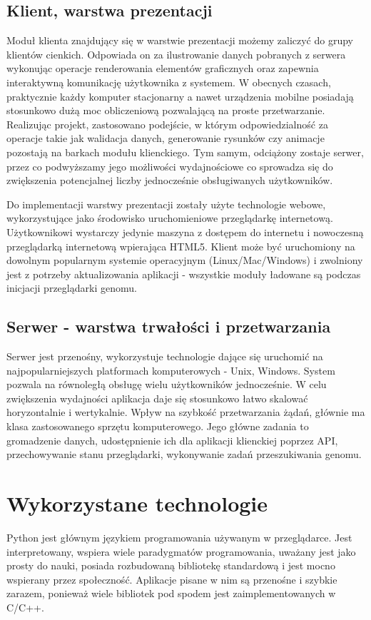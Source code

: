 \subsection*{Klient, warstwa prezentacji}
Moduł klienta znajdujący się w warstwie prezentacji możemy zaliczyć do grupy klientów cienkich.
Odpowiada on za ilustrowanie danych pobranych z serwera wykonując operacje renderowania elementów graficznych oraz zapewnia interaktywną komunikację użytkownika z systemem.
W obecnych czasach, praktycznie każdy komputer stacjonarny a nawet urządzenia mobilne posiadają stosunkowo dużą moc obliczeniową pozwalającą na proste przetwarzanie.
Realizując projekt, zastosowano podejście, w którym odpowiedzialność za operacje takie jak walidacja danych, generowanie rysunków czy animacje pozostają na barkach modułu klienckiego. 
Tym samym, odciążony zostaje serwer, przez co podwyższamy jego możliwości wydajnościowe co sprowadza się do zwiększenia potencjalnej liczby jednocześnie obsługiwanych użytkowników.

Do implementacji warstwy prezentacji zostały użyte technologie webowe, wykorzystujące jako środowisko uruchomieniowe przeglądarkę internetową. Użytkownikowi wystarczy jedynie maszyna z dostępem do internetu i nowoczesną przeglądarką internetową wpierająca HTML5. 
Klient może być uruchomiony na dowolnym popularnym systemie operacyjnym \mbox{(Linux/Mac/Windows)} i zwolniony jest z potrzeby aktualizowania aplikacji - wszystkie moduły ładowane są podczas inicjacji przeglądarki genomu.

\subsection*{Serwer - warstwa trwałości i przetwarzania}
Serwer jest przenośny, wykorzystuje technologie dające się uruchomić na najpopularniejszych platformach komputerowych - Unix, Windows.
System pozwala na równoległą obsługę wielu użytkowników jednocześnie.
W celu zwiększenia wydajności aplikacja daje się stosunkowo łatwo skalować horyzontalnie i wertykalnie.
Wpływ na szybkość przetwarzania żądań, głównie ma klasa zastosowanego sprzętu komputerowego.
Jego główne zadania to gromadzenie danych, udostępnienie ich dla aplikacji klienckiej poprzez API, przechowywanie stanu przeglądarki, wykonywanie zadań przeszukiwania genomu.

\section{Wykorzystane technologie}
Python jest głównym językiem programowania używanym w przeglądarce.
Jest interpretowany, wspiera wiele paradygmatów programowania, uważany jest jako prosty do nauki, posiada rozbudowaną bibliotekę standardową i jest mocno wspierany przez społeczność. 
Aplikacje pisane w nim są przenośne i szybkie zarazem, ponieważ wiele bibliotek pod spodem jest zaimplementowanych w C/C++.

